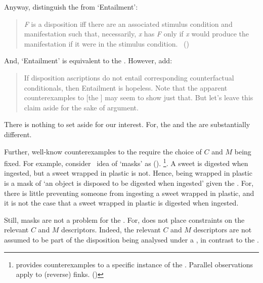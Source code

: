 \begin{note}
{    Anyway, \citeauthor{Choi:2021wg} distinguish the \dSCAa{} from `Entailment':
    \begin{quote}
      \emph{F} is a disposition iff there are an associated stimulus condition and manifestation such that, necessarily, \emph{x} has \emph{F} only if \emph{x} would produce the manifestation if it were in the stimulus condition.%
      \mbox{ }\hfill\mbox{(\citeyear[\S2.1]{Choi:2021wg})}
    \end{quote}
    And, `Entailment' is equivalent to the .
    However, \citeauthor{Choi:2021wg} add:
    \begin{quote}
      If disposition ascriptions do not entail corresponding counterfactual conditionals, then Entailment is hopeless.
      Note that the apparent counterexamples to [the \dSCAa{}] may seem to show just that.
      But let's leave this claim aside for the sake of argument.
    \end{quote}
    There is nothing to set aside for our interest.
    For, the \dSCAa{} and the \dBCAa{} are substantially different.
  }

  Further, well-know counterexamples to the \dSCAa{} require the choice of \(C\) and \(M\) being fixed.
  For example, consider~\citeauthor{Clarke:2010aa} idea of `masks' as  (\citeyear[153]{Clarke:2010aa}).%
  \footnote{
    \cite{Johnston:1992aa} provides counterexamples to a specific instance of the \dBCAa{}.
    Parallel observations apply to (reverse) finks.
    (\cite{Martin:1994aa})
  }.
  A sweet is digested when ingested, but a sweet wrapped in plastic is not.
  Hence, being wrapped in plastic is a mask of `an object is disposed to be digested when ingested' given the \dSCAa{}.
  For, there is little preventing someone from ingesting a sweet wrapped in plastic, and it is not the case that a sweet wrapped in plastic is digested when ingested.

  Still, masks are not a problem for the \dBCAa{}.
  For, \dBCAa{} does not place constraints on the relevant \(C\) and \(M\) descriptors.
  Indeed, the relevant \(C\) and \(M\) descriptors are not assumed to be part of the disposition being analysed under a \dBCAa{}, in contrast to the \dSCAa{}.


\end{note}
